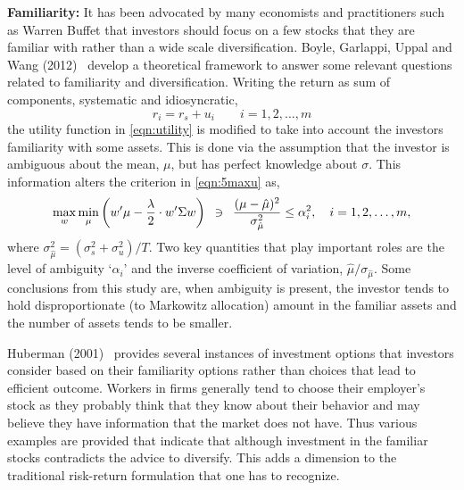 \noindent \textbf{Familiarity:} It has been advocated by many economists and practitioners such as Warren Buffet that investors should focus on a few stocks that they are familiar with rather than a wide scale diversification. Boyle, Garlappi, Uppal and Wang (2012)~\cite{bguwang} develop a theoretical framework to answer some relevant questions related to familiarity and diversification. Writing the return as sum of components, systematic and idiosyncratic,
	\begin{equation} \label{eqn:rirsui}
	r_i = r_s + u_i \quad\quad i= 1, 2, \ldots, m
	\end{equation}
the utility function in \eqref{eqn:utility} is modified to take into account the investors familiarity with some assets. This is done via the assumption that the investor is ambiguous about the mean, $\mu$, but has perfect knowledge about $\sigma$. This information alters the criterion in \eqref{eqn:5maxu} as,
	\begin{equation}\label{eqn:maxminwmu}
	\max_w \min_\mu \left( w'\mu - \frac{\lambda}{2} \cdot w' \Sigma w \right) \enskip \ni \enskip \dfrac{(\mu-\hat{\mu})^2}{\sigma_{\hat{\mu}}^2} \leq \alpha_i^2, \quad i= 1, 2, \ldots, m,
	\end{equation}
where $\sigma_{\hat{\mu}}^2= (\sigma_s^2+\sigma_u^2)/T$. Two key quantities that play important roles are the level of ambiguity `$\alpha_i$' and the inverse coefficient of variation, $\hat{\mu}/\sigma_{\hat{\mu}}$. Some conclusions from this study are, when ambiguity is present, the investor tends to hold disproportionate (to Markowitz allocation) amount in the familiar assets and the number of assets tends to be smaller.


Huberman (2001)~\cite{Hub} provides several instances of investment options that investors consider based on their familiarity options rather than choices that lead to efficient outcome. Workers in firms generally tend to choose their employer's stock as they probably think that they know about their behavior and may believe they have information that the market does not have. Thus various examples are provided that indicate that although investment in the familiar stocks contradicts the advice to diversify. This adds a dimension to the traditional risk-return formulation that one has to recognize. \twomedskip


